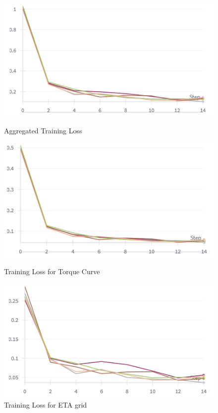 \documentclass{report} %
\begin{document}
\begin{figure}[H]
    \centering
    \begin{minipage}[b]{0.3\textwidth}
        \includegraphics[width=\textwidth]{./ReportImages/train_loss.png}
        \caption{Aggregated Training Loss}
        \label{fig:Aggregated Training Loss}
    \end{minipage}
    \hfill
    \begin{minipage}[b]{0.3\textwidth}
        \includegraphics[width=\textwidth]{./ReportImages/train_loss_y1.png}
        \caption{Training Loss for Torque Curve}
        \label{fig:Training Loss for Torque Curve}
    \end{minipage}
    \hfill
    \begin{minipage}[b]{0.3\textwidth}
        \includegraphics[width=\textwidth]{./ReportImages/train_loss_y2.png}
        \caption{Training Loss for ETA grid}
        \label{fig:Training Loss for ETA grid}
    \end{minipage}
\end{figure}
\end{document}
